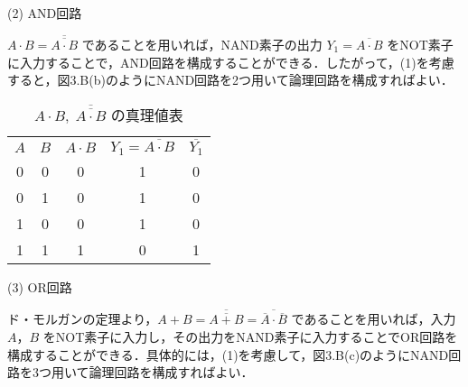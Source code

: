 \vspace{7mm}
\noindent
(2) AND回路 \vspace{2mm}

$A \cdot B = \overline{\overline{A \cdot B}}$ であることを用いれば，NAND素子の出力 $Y_1 = \overline{A \cdot B}$ をNOT素子に入力することで，AND回路を構成することができる．したがって，(1)を考慮すると，図3.B(b)のようにNAND回路を2つ用いて論理回路を構成すればよい．

\begin{table}[!h]
    \caption{$A \cdot B,\; \overline{\overline{A \cdot B}}$ の真理値表}
    \label{tbl02}
    \begin{center}
        \begin{tabular}{|c|c||c|c|c|}
            \hline
            $A$ & $B$ & $A \cdot B$ & $Y_1 = \overline{A \cdot B}$ & $\overline{Y_1}$ \\
            \hhline{|=|=#=|=|=|}
            0   & 0   & 0           & 1                            & 0                \\
            \hline
            0   & 1   & 0           & 1                            & 0                \\
            \hline
            1   & 0   & 0           & 1                            & 0                \\
            \hline
            1   & 1   & 1           & 0                            & 1                \\
            \hline
        \end{tabular}
    \end{center}
\end{table}

\vspace{7mm}
\noindent
(3) OR回路 \vspace{2mm}

ド・モルガンの定理より，$A + B = \overline{\overline{A + B}} = \overline{\overline{A} \cdot \overline{B}}$ であることを用いれば，入力 $A$，$B$ をNOT素子に入力し，その出力をNAND素子に入力することでOR回路を構成することができる．具体的には，(1)を考慮して，図3.B(c)のようにNAND回路を3つ用いて論理回路を構成すればよい．

